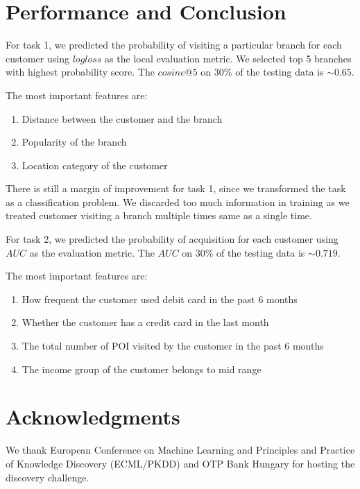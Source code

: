 \documentclass[a4paper]{llncs}
\begin{document}
\section{Performance and Conclusion}
For task 1, we predicted the probability of visiting a particular branch for each customer using $logloss$ as the local evaluation metric.
 We selected top 5 branches with highest probability score. The $cosine@5$ on 30\% of the testing data is $\sim0.65$.

The most important features are:

\begin{enumerate}
 \item Distance between the customer and the branch
 \item Popularity of the branch
 \item Location category of the customer

\end{enumerate}

There is still a margin of improvement for task 1, since we transformed the task as a classification problem.
 We discarded too much information in training as we treated customer visiting a branch multiple times same as a single time.

For task 2, we predicted the probability of acquisition for each customer using $AUC$ as the evaluation metric.
The $AUC$ on 30\% of the testing data is $\sim0.719$.

The most important features are:

\begin{enumerate}
 \item How frequent the customer used debit card in the past 6 months

 \item Whether the customer has a credit card in the last month

 \item The total number of POI visited by the customer in the past 6 months

 \item The income group of the customer belongs to mid range
\end{enumerate}

\section{Acknowledgments}
We thank European Conference on Machine Learning and Principles and Practice of Knowledge Discovery (ECML/PKDD)
and OTP Bank Hungary for hosting the discovery challenge.





\end{document}

